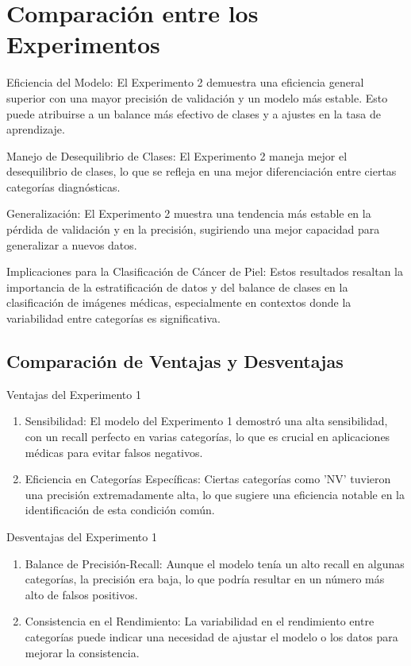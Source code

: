 \section{Comparación entre los Experimentos}\label{subsubsec:comparison_exp}

Eficiencia del Modelo: El Experimento 2 demuestra una eficiencia general superior con una mayor precisión de validación y un modelo más estable. Esto puede atribuirse a un balance más efectivo de clases y a ajustes en la tasa de aprendizaje.

Manejo de Desequilibrio de Clases: El Experimento 2 maneja mejor el desequilibrio de clases, lo que se refleja en una mejor diferenciación entre ciertas categorías diagnósticas.

Generalización: El Experimento 2 muestra una tendencia más estable en la pérdida de validación y en la precisión, sugiriendo una mejor capacidad para generalizar a nuevos datos.

Implicaciones para la Clasificación de Cáncer de Piel: Estos resultados resaltan la importancia de la estratificación de datos y del balance de clases en la clasificación de imágenes médicas, especialmente en contextos donde la variabilidad entre categorías es significativa.

\subsection{Comparación de Ventajas y Desventajas}

Ventajas del Experimento 1
\begin{enumerate}
    \item Sensibilidad: El modelo del Experimento 1 demostró una alta sensibilidad, con un recall perfecto en varias categorías, lo que es crucial en aplicaciones médicas para evitar falsos negativos.
    \item Eficiencia en Categorías Específicas: Ciertas categorías como 'NV' tuvieron una precisión extremadamente alta, lo que sugiere una eficiencia notable en la identificación de esta condición común.
\end{enumerate}

Desventajas del Experimento 1
\begin{enumerate}
    \item Balance de Precisión-Recall: Aunque el modelo tenía un alto recall en algunas categorías, la precisión era baja, lo que podría resultar en un número más alto de falsos positivos.
    \item Consistencia en el Rendimiento: La variabilidad en el rendimiento entre categorías puede indicar una necesidad de ajustar el modelo o los datos para mejorar la consistencia.
\end{enumerate}

